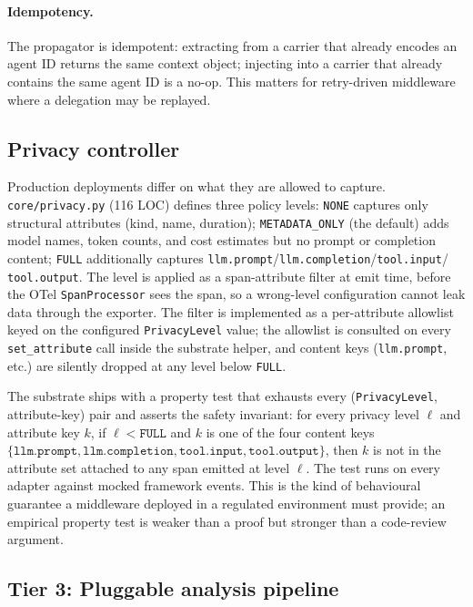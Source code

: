 \documentclass[sigconf,review,anonymous,9pt]{acmart}
\begin{document}
\paragraph{Idempotency.} The propagator is idempotent: extracting
from a carrier that already encodes an agent ID returns the same
context object; injecting into a carrier that already contains the
same agent ID is a no-op. This matters for retry-driven middleware
where a delegation may be replayed.

\subsection{Privacy controller}

Production deployments differ on what they are allowed to capture.
\texttt{core/privacy.py} (116 LOC) defines three policy levels:
\texttt{NONE} captures only structural attributes (kind, name,
duration); \texttt{METADATA\_ONLY} (the default) adds model names,
token counts, and cost estimates but no prompt or completion
content; \texttt{FULL} additionally captures
\texttt{llm.prompt}/\texttt{llm.completion}/\texttt{tool.input}/
\texttt{tool.output}. The level is applied as a span-attribute
filter at emit time, before the OTel \texttt{SpanProcessor}
sees the span, so a wrong-level configuration cannot leak data
through the exporter. The filter is implemented as a per-attribute
allowlist keyed on the configured \texttt{PrivacyLevel} value; the
allowlist is consulted on every \texttt{set\_attribute} call inside
the substrate helper, and content keys (\texttt{llm.prompt}, etc.)
are silently dropped at any level below \texttt{FULL}.

The substrate ships with a property test that exhausts every
(\texttt{PrivacyLevel}, attribute-key) pair and asserts the safety
invariant: for every privacy level $\ell$ and attribute key $k$, if
$\ell < \texttt{FULL}$ and $k$ is one of the four content keys
$\{\texttt{llm.prompt}, \texttt{llm.completion}, \texttt{tool.input},
\texttt{tool.output}\}$, then $k$ is not in the attribute set
attached to any span emitted at level $\ell$. The test runs on every
adapter against mocked framework events. This is the kind of
behavioural guarantee a middleware deployed in a regulated
environment must provide; an empirical property test is weaker than
a proof but stronger than a code-review argument.

\subsection{Tier 3: Pluggable analysis pipeline}
\end{document}
